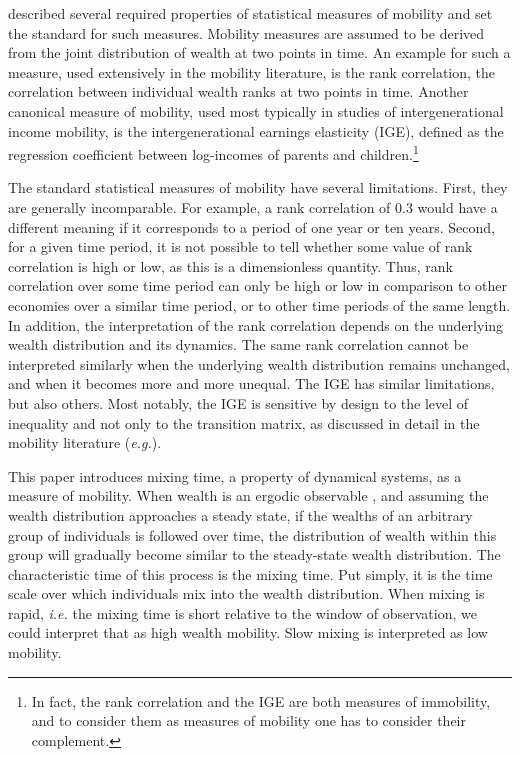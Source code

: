 \documentclass[11pt]{article}
\newcommand{\ie}{{\it i.e.}\xspace}
\newcommand{\eg}{{\it e.g.}\xspace}
\numberwithin{equation}{section}
\begin{document}
\citet{Shorrocks1978} described several required properties of statistical measures of mobility and set the standard for such measures. Mobility measures are assumed to be derived from the joint distribution of wealth at two points in time.
An example for such a measure, used extensively in the mobility literature, is the rank correlation, the correlation between individual wealth ranks at two points in time. Another canonical measure of mobility, used most typically in studies of intergenerational income mobility, is the intergenerational earnings elasticity (IGE), defined as the regression coefficient between log-incomes of parents and children.\footnote{In fact, the rank correlation and the IGE are both measures of immobility, and to consider them as measures of mobility one has to consider their complement.}

The standard statistical measures of mobility have several limitations. First, they are generally incomparable. For example, a rank correlation of 0.3 would have a different meaning if it corresponds to a period of one year or ten years. Second, for a given time period, it is not possible to tell whether some value of rank correlation is high or low, as this is a dimensionless quantity. Thus, rank correlation over some time period can only be high or low in comparison to other economies over a similar time period, or to other time periods of the same length.
In addition, the interpretation of the rank correlation depends on the underlying wealth distribution and its dynamics. The same rank correlation cannot be interpreted similarly when the underlying wealth distribution remains unchanged, and when it becomes more and more unequal.
The IGE has similar limitations, but also others. Most notably, the IGE is sensitive by design to the level of inequality and not only to the transition matrix, as discussed in detail in the mobility literature (\eg \citet{chettyETAL2014}).

This paper introduces mixing time, a property of dynamical systems, as a measure of mobility. When wealth is an ergodic observable \citep{PetersAdamou2018c}, and assuming the wealth distribution approaches a steady state, if the wealths of an arbitrary group of individuals is followed over time, the distribution of wealth within this group will gradually become similar to the steady-state wealth distribution. The characteristic time of this process is the mixing time. Put simply, it is the time scale over which individuals mix into the wealth distribution. When mixing is rapid, \ie the mixing time is short relative to the window of observation, we could interpret that as high wealth mobility. Slow mixing is interpreted as low mobility.
\end{document}
